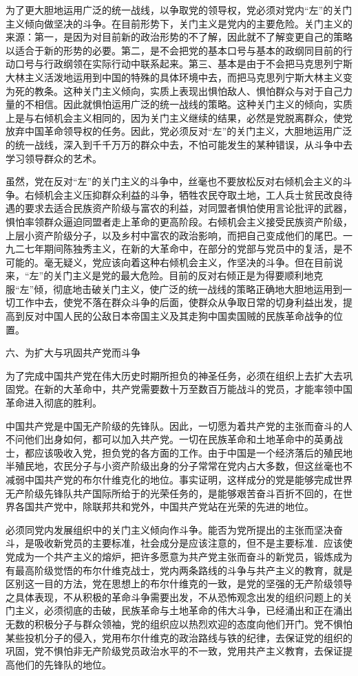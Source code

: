 为了更大胆地运用广泛的统一战线，以争取党的领导权，党必须对党内“左”的关门主义倾向做坚决的斗争。在目前形势下，关门主义是党内的主要危险。关门主义的来源：第一，是因为对目前新的政治形势的不了解，因此就不了解变更自己的策略以适合于新的形势的必要。第二，是不会把党的基本口号与基本的政纲同目前的行动口号与行政纲领在实际行动中联系起来。第三、基本是由于不会把马克思列宁斯大林主义活泼地运用到中国的特殊的具体环境中去，而把马克思列宁斯大林主义变为死的教条。这种关门主义倾向，实质上表现出惧怕敌人、惧怕群众与对于自己力量的不相信。因此就惧怕运用广泛的统一战线的策略。这种关门主义的倾向，实质上是与右倾机会主义相同的，因为关门主义继续的结果，必然是党脱离群众，使党放弃中国革命领导权的任务。因此，党必须反对“左”的关门主义，大胆地运用广泛的统一战线，深入到千千万万的群众中去，不怕可能发生的某种错误，从斗争中去学习领导群众的艺术。

虽然，党在反对“左”的关门主义的斗争中，丝毫也不要放松反对右倾机会主义的斗争。右倾机会主义压抑群众利益的斗争，牺牲农民夺取土地，工人兵士贫民改良待遇的要求去适合民族资产阶级与富农的利益，对同盟者惧怕使用言论批评的武器，惧怕率领群众逼迫同盟者走上革命的更高阶段。右倾机会主义接受民族资产阶级，上层小资产阶级分子，以及乡村中富农的政治影响，而把自己变成他们的尾巴。一九二七年期间陈独秀主义，在新的大革命中，在部分的党部与党员中的复活，是不可能的。毫无疑义，党应该向着这种右倾机会主义，作坚决的斗争。但在目前说来，“左”的关门主义是党的最大危险。目前的反对右倾正是为得要顺利地克服“左”倾，彻底地击破关门主义，使广泛的统一战线的策略正确地大胆地运用到一切工作中去，使党不落在群众斗争的后面，使群众从争取日常的切身利益出发，提高到反对中国人民的公敌日本帝国主义及其走狗中国卖国贼的民族革命战争的位置。

六、为扩大与巩固共产党而斗争

为了完成中国共产党在伟大历史时期所担负的神圣任务，必须在组织上去扩大去巩固党。在新的大革命中，共产党需要数十万至数百万能战斗的党员，才能率领中国革命进入彻底的胜利。

中国共产党是中国无产阶级的先锋队。因此，一切愿为着共产党的主张而奋斗的人不问他们出身如何，都可以加入共产党。一切在民族革命和土地革命中的英勇战士，都应该吸收入党，担负党的各方面的工作。由于中国是一个经济落后的殖民地半殖民地，农民分子与小资产阶级出身的分子常常在党内占大多数，但这丝毫也不减弱中国共产党的布尔什维克化的地位。事实证明，这样成分的党是能够完成世界无产阶级先锋队共产国际所给于的光荣任务的，是能够艰苦奋斗百折不回的，在世界各国共产党中，除联邦共和党外，中国共产党站在光荣的先进的地位。

必须同党内发展组织中的关门主义倾向作斗争。能否为党所提出的主张而坚决奋斗，是吸收新党员的主要标准，社会成分是应该注意的，但不是主要标准．应该使党成为一个共产主义的熔炉，把许多愿意为共产党主张而奋斗的新党员，锻炼成为有最高阶级觉悟的布尔什维克战士，党内两条路线的斗争与共产主义的教育，就是区别这一目的方法，党在思想上的布尔什维克的一致，是党的坚强的无产阶级领导之具体表现，不从积极的革命斗争需要出发，不从恐怖观念出发的组织问题上的关门主义，必须彻底的击破，民族革命与土地革命的伟大斗争，已经涌出和正在涌出无数的积极分子与群众领袖，党的组织应以热烈欢迎的态度向他们开门。党不惧怕某些投机分子的侵入，党用布尔什维克的政治路线与铁的纪律，去保证党的组织的巩固，党不惧怕非无产阶级党员政治水平的不一致，党用共产主义教育，去保证提高他们的先锋队的地位。

